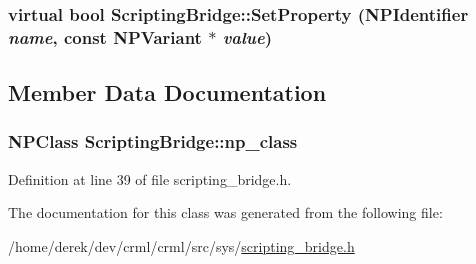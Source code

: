 \label{class_scripting_bridge_a4948d9d87de0dc58627c8b377356df34}
\hypertarget{class_scripting_bridge_aee815679c5b398c1d288322d6b21e81d}{
\subsubsection[{SetProperty}]{\setlength{\rightskip}{0pt plus 5cm}virtual bool ScriptingBridge::SetProperty (NPIdentifier {\em name}, \/  const NPVariant $\ast$ {\em value})}}
\label{class_scripting_bridge_aee815679c5b398c1d288322d6b21e81d}


\subsection{Member Data Documentation}
\hypertarget{class_scripting_bridge_a4fcbbbaf7a6d91a2766066fa2cb2236b}{
\subsubsection[{np\_\-class}]{\setlength{\rightskip}{0pt plus 5cm}NPClass {\bf ScriptingBridge::np\_\-class}}}
\label{class_scripting_bridge_a4fcbbbaf7a6d91a2766066fa2cb2236b}


Definition at line 39 of file scripting\_\-bridge.h.



The documentation for this class was generated from the following file:\begin{DoxyCompactItemize}
\item 
/home/derek/dev/crml/crml/src/sys/\hyperlink{src_2sys_2scripting__bridge_8h}{scripting\_\-bridge.h}\end{DoxyCompactItemize}
